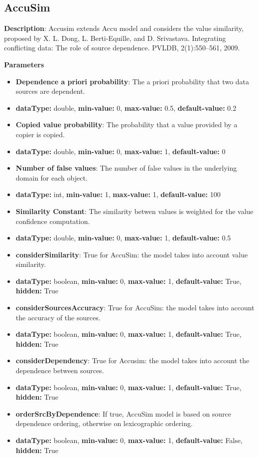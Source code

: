 \documentclass[a4paper,10pt]{scrartcl}
\begin{document}
\subsection{AccuSim}
\begin{description}
\item \textbf{Description}: Accusim extends Accu model and considers the value similarity, proposed by X. L. Dong, L. Berti-Equille, and D. Srivastava. Integrating conflicting data: The role of source dependence. PVLDB, 2(1):550–561, 2009.
\item \textbf{Parameters}
\begin{itemize}
\item \textbf{Dependence a priori probability}: The a priori probability that two data sources are dependent.
\item[]\textbf{dataType: }double, \textbf{min-value: }0, \textbf{max-value: }0.5, \textbf{default-value: }0.2\item \textbf{Copied value probability}: The probability that a value provided by a copier is copied.
\item[]\textbf{dataType: }double, \textbf{min-value: }0, \textbf{max-value: }1, \textbf{default-value: }0\item \textbf{Number of false values}: The number of false values in the underlying domain for each object.
\item[]\textbf{dataType: }int, \textbf{min-value: }1, \textbf{max-value: }1, \textbf{default-value: }100\item \textbf{Similarity Constant}: The similarity betwen values is weighted for the value confidence computation.
\item[]\textbf{dataType: }double, \textbf{min-value: }0, \textbf{max-value: }1, \textbf{default-value: }0.5\item \textbf{considerSimilarity}: True for AccuSim: the model takes into account value similarity.
\item[]\textbf{dataType: }boolean, \textbf{min-value: }0, \textbf{max-value: }1, \textbf{default-value: }True, \textbf{hidden: }True
\item \textbf{considerSourcesAccuracy}: True for AccuSim: the model takes into account the accuracy of the sources.
\item[]\textbf{dataType: }boolean, \textbf{min-value: }0, \textbf{max-value: }1, \textbf{default-value: }True, \textbf{hidden: }True
\item \textbf{considerDependency}: True for Accusim: the model takes into account the dependence between sources.
\item[]\textbf{dataType: }boolean, \textbf{min-value: }0, \textbf{max-value: }1, \textbf{default-value: }True, \textbf{hidden: }True
\item \textbf{orderSrcByDependence}: If true, AccuSim model is based on source dependence ordering, otherwise on lexicographic ordering.
\item[]\textbf{dataType: }boolean, \textbf{min-value: }0, \textbf{max-value: }1, \textbf{default-value: }False, \textbf{hidden: }True
\end{itemize}
\end{description}
\end{document}
